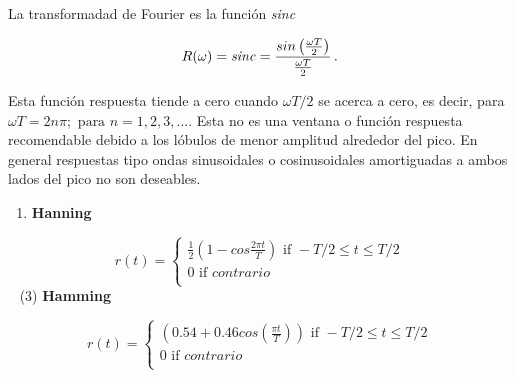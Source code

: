 \documentclass[
]{agujournal2019}
\providecommand{\tightlist}{%
  \setlength{\itemsep}{0pt}\setlength{\parskip}{0pt}}\usepackage{longtable,booktabs,array}
\begin{document}
\begin{center}
\end{center}

La transformadad de Fourier es la función \emph{sinc}

\[R(\omega)={\it sinc}=\frac{sin\left(\frac{\omega T}{2}\right)}{\frac{\omega T}{2}}\,.\]

\begin{center}
\end{center}

Esta función respuesta tiende a cero cuando \(\omega T / 2\) se acerca a
cero, es decir, para
\(\omega T=2 n \pi;\,\,\text{para}\,\,n=1,2,3,...\). Esta no es una
ventana o función respuesta recomendable debido a los lóbulos de menor
amplitud alrededor del pico. En general respuestas tipo ondas
sinusoidales o cosinusoidales amortiguadas a ambos lados del pico no son
deseables.

\vspace{0.75cm}

\begin{enumerate}
\def\labelenumi{(\arabic{enumi})}
\setcounter{enumi}{1}
\tightlist
\item
  \textbf{Hanning}
\end{enumerate}

\begin{equation*}
  r(t)=\left\lbrace
  \begin{array}{l}
     \frac{1}{2}\left( 1-cos\frac{2\pi t}{T}\right)
      \text{ if } -T/2 \le t \le T/2 \\
     0 \text{ if } { contrario} \\
  \end{array}
  \right.
  \end{equation*} ~ (3) \textbf{Hamming}

\begin{equation*}
  r(t)=\left\lbrace
  \begin{array}{l}
     \left(0.54  + 0.46 cos(\frac{\pi t}{T}) \right) \text{ if } -T/2 \le t \le T/2 \\
     0 \text{ if } { contrario} \\
  \end{array}
  \right.
  \end{equation*}

\begin{center}
\end{center}
\end{document}
